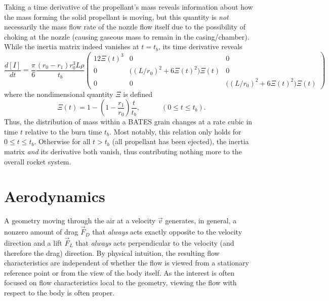\documentclass[11pt,dvipsnames]{thesis}
\begin{document}
Taking a time derivative of the propellant's mass reveals information about how the mass forming the solid propellant is moving, but this quantity is \textit{not} necessarily the mass flow rate of the nozzle flow itself due to the possibility of choking at the nozzle (causing gaseous mass to remain in the casing/chamber). While the inertia matrix indeed vanishes at $t = t_b$, its time derivative reveals
\begin{equation}
\frac{d[I]}{dt} = \frac{\pi}{6}\frac{(r_0 - r_1)r_0^3 L \rho}{t_b}\begin{pmatrix}12\Xi(t)^3 & 0 & 0 \\ 0 & \big((L / r_0)^2 + 6\Xi(t)^2\big)\Xi(t) & 0 \\ 0 & 0 & \big((L / r_0)^2 + 6\Xi(t)^2\big)\Xi(t) \end{pmatrix}
\end{equation}
where the nondimensional quantity $\Xi$ is defined
\begin{equation}
\Xi(t) = 1 - \left(1 - \frac{r_1}{r_0}\right) \frac{t}{t_b}, \qquad\quad (0 \leqslant t \leqslant t_b).
\end{equation}
Thus, the distribution of mass within a BATES grain changes at a rate cubic in time $t$ relative to the burn time $t_b$. Most notably, this relation only holds for $0 \leqslant t \leqslant t_b$. Otherwise for all $t > t_b$ (all propellant has been ejected), the inertia matrix \textit{and} its derivative both vanish, thus contributing nothing more to the overall rocket system.


\chapter{Aerodynamics}

A geometry moving through the air at a velocity $\vec{v}$ generates, in general, a nonzero amount of drag $\vec{F}_D$ that \textit{always} acts exactly opposite to the velocity direction and a lift $\vec{F}_L$ that \textit{always} acts perpendicular to the velocity (and therefore the drag) direction. By physical intuition, the resulting flow characteristics are independent of whether the flow is viewed from a stationary reference point or from the view of the body itself. As the interest is often focused on flow characteristics local to the geometry, viewing the flow with respect to the body is often proper.
\end{document}
